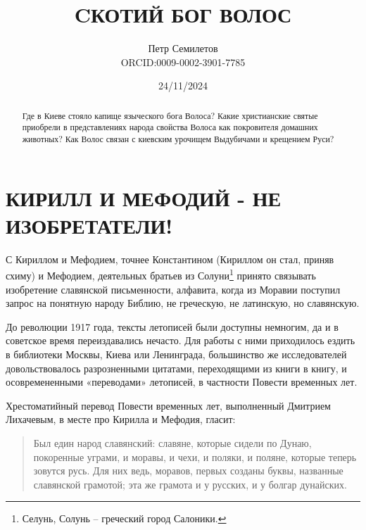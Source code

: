 \documentclass[a5paper,11pt,openany]{article}
\title{CКОТИЙ БОГ ВОЛОС\\
\textsmaller[2]{редакция 1.0}}
\author{Петр Семилетов\\ORCID:0009-0002-3901-7785 \orcidlink{0009-0002-3901-7785}}
\date{24/11/2024}
\begin{document}
\maketitle

\pagestyle{empty}


\newpage

\pagestyle{plain}



%
%
%

\begin{abstract}
Где в Киеве стояло капище языческого бога Волоса? Какие христианские святые приобрели в представлениях народа свойства Волоса как покровителя домашних животных? Как Волос связан с киевским урочищем Выдубичами и крещением Руси?
\end{abstract}


\section{КИРИЛЛ И МЕФОДИЙ - НЕ ИЗОБРЕТАТЕЛИ!}

С Кириллом и Мефодием, точнее Константином (Кириллом он стал, приняв схиму) и Мефодием, деятельных братьев из Солуни\footnote{Селунь, Солунь – греческий город Салоники.} принято связывать изобретение славянской письменности, алфавита, когда из Моравии поступил запрос на понятную народу Библию, не греческую, не латинскую, но славянскую.

До революции 1917 года, тексты летописей были доступны немногим, да и в советское время переиздавались нечасто. Для работы с ними приходилось ездить в библиотеки Москвы, Киева или Ленинграда, большинство же исследователей довольствовалось разрозненными цитатами, переходящими из книги в книгу, и осовремененными «переводами» летописей, в частности Повести временных лет.

Хрестоматийный перевод Повести временных лет, выполненный Дмитрием Лихачевым, в месте про Кирилла и Мефодия, гласит: 

\begin{quotation}
Был един народ славянский: славяне, которые сидели по Дунаю, покоренные уграми, и моравы, и чехи, и поляки, и поляне, которые теперь зовутся русь. Для них ведь, моравов, первых созданы буквы, названные славянской грамотой; эта же грамота и у русских, и у болгар дунайских.
\end{quotation}
\end{document}
